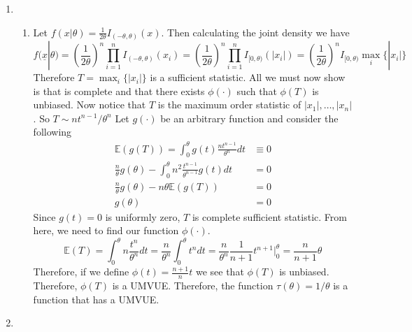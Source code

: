 \documentclass[12pt]{article}  %
\newcommand{\E}{{\mathbb{E}}}
\begin{document}
\begin{enumerate}
\item 
	\begin{enumerate}
		\item Let $f(x|\theta) = \frac{1}{2\theta}I_{(-\theta,\theta)}(x)$. Then calculating the joint density we have $$f(\underline{x}|\theta) = \left(\frac{1}{2\theta}\right)^n\prod_{i=1}^n I_{(-\theta, \theta)}(x_i) = \left(\frac{1}{2\theta}\right)^n\prod_{i=1}^n I_{[0,\theta)}(|x_i|) = \left(\frac{1}{2\theta}\right)^nI_{[0,\theta)}\max_i\{|x_i|\} $$ Therefore $T = \max_{i}\{|x_i|\}$ is a sufficient statistic. All we must now show is that is complete and that there exists $\phi(\cdot)$ such that $\phi(T)$ is unbiased. Now notice that $T$ is the maximum order statistic of $|x_1|, \ldots,|x_n|$. So $T\sim nt^{n-1}/\theta^n$ Let $g(\cdot)$ be an arbitrary function and consider the following 
		\begin{align*}
			\E(g(T)) = \int_{0}^{\theta}g(t)\frac{nt^{n-1}}{\theta^n}dt &\equiv 0\\
			\frac{n}{\theta}g(\theta) - \int_{0}^{\theta}n^2\frac{t^{n-1}}{\theta^{n-1}}g(t)dt &= 0\\
			 \frac{n}{\theta}g(\theta) - n\theta\E(g(T)) &= 0\\
			 g(\theta) &= 0 
		\end{align*}
		Since $g(t)=0$ is uniformly zero, $T$ is complete sufficient statistic. From here, we need to find our function $\phi(\cdot)$. $$\E(T) = \int_{0}^{\theta}n\frac{t^n}{\theta^n}dt = \frac{n}{\theta^n}\int_0^{\theta}t^ndt = \frac{n}{\theta^n}\frac{1}{n+1}t^{n+1}\Big|_{0}^{\theta} = \frac{n}{n+1}\theta$$ Therefore, if we define $\phi(t) = \frac{n+1}{n}t$ we see that $\phi(T)$ is unbiased. Therefore, $\phi(T)$ is a UMVUE. Therefore, the function $\tau(\theta) = 1/\theta$ is a function that has a UMVUE.   
	\end{enumerate}


\item 
	\begin{enumerate}


\end{enumerate}
\end{enumerate}
\end{document}
